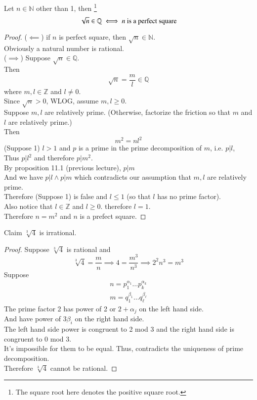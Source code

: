 \documentclass[11pt]{article}
\begin{document}
	\begin{theorem}[Generalization]
		Let $n \in \mathbb{N}$ other than 1, then \footnote{The square root here denotes the positive square root.}
		\[
			\sqrt{n} \in \mathbb{Q} \iff n \text{{ is a perfect square}}
		\]
	\end{theorem}
	\begin{proof}
		($\impliedby$) if $n$ is perfect square, then $\sqrt{n} \in \mathbb{N}$. \\
		Obviously a natural number is rational. \\
		($\implies$) Suppose $\sqrt{n} \in \mathbb{Q}$. \\
		Then 
		\[
			\sqrt{n} = \frac{m}{l} \in \mathbb{Q}
		\]where $m, l \in \mathbb{Z}$ and $l \neq 0$. \\
		Since $\sqrt{n} > 0$, WLOG, assume $m, l \geq 0$. \\
		Suppose $m, l$ are relatively prime. (Otherwise, factorize the friction so that $m$ and $l$ are relatively prime.)\\
		Then 
		\[
			m^2 = n l^2
		\]
		(Suppose 1) $l > 1 $ and $p$ is a prime in the prime decomposition of $m$, i.e. $p | l$, \\
		Thus $p | l^2$ and therefore $p | m^2$. \\
		By proposition 11.1 (previous lecture), $p | m$ \\
		And we have $p | l \land p | m$ which contradicts our assumption that $m, l$ are relatively prime. \\
		Therefore (Suppose 1) is false and $l \leq 1$ (so that $l$ has no prime factor). \\
		Also notice that $l \in \mathbb{Z}$ and $l \geq 0$. therefore $l = 1$. \\
		Therefore $n = m^2$ and $n$ is a prefect square.
	\end{proof}
	
	\begin{example}
		Claim $\sqrt[3]{4}$ is irrational.
	\end{example}
	\begin{proof}
		Suppose $\sqrt[3]{4}$ is rational and 
		\[
			\sqrt[3]{4} = \frac{m}{n} \implies 4 = \frac{m^3}{n^3} \implies 2^2 n^3 = m^3
		\]
		Suppose 
		\begin{gather*}
			n = p_1^{\alpha_1} \dots p_k^{\alpha_k} \\
			m = q_1^{\beta_1} \dots q_\ell^{\beta_{\ell}}
		\end{gather*}
		The prime factor 2 has power of 2 or $2 + \alpha_j$ on the left hand side. \\
		And have power of $3\beta_i$ on the right hand side. \\
		The left hand side power is congruent to 2 mod 3 and the right hand side is congruent to 0 mod 3. \\
		It's impossible for them to be equal. Thus, contradicts the uniqueness of prime decomposition. \\
		Therefore $\sqrt[3]{4}$ cannot be rational.
	\end{proof}
	
\end{document}
